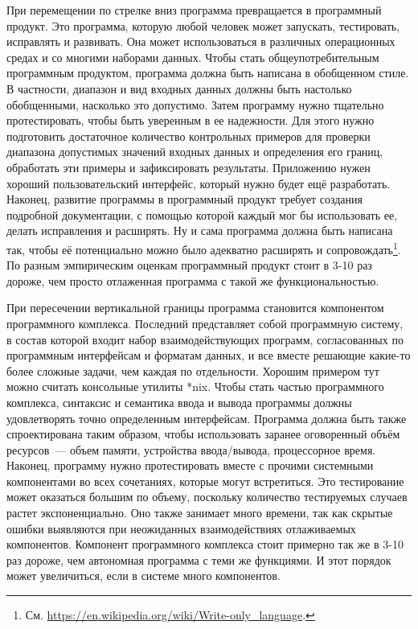 \documentclass{../../text-style}
\begin{document}
При перемещении по стрелке вниз программа превращается в программный продукт. Это программа, которую любой человек может запускать, тестировать, исправлять и развивать. Она может использоваться в различных операционных средах и со многими наборами данных. Чтобы стать общеупотребительным программным продуктом, программа должна быть написана в обобщенном стиле. В частности, диапазон и вид входных данных должны быть настолько обобщенными, насколько это допустимо. Затем программу нужно тщательно протестировать, чтобы быть уверенным в ее надежности. Для этого нужно подготовить достаточное количество контрольных примеров для проверки диапазона допустимых значений входных данных и определения его границ, обработать эти примеры и зафиксировать результаты. Приложению нужен хороший пользовательский интерфейс, который нужно будет ещё разработать. Наконец, развитие программы в программный продукт требует создания подробной документации, с помощью которой каждый мог бы использовать ее, делать исправления и расширять. Ну и сама программа должна быть написана так, чтобы её потенциально можно было адекватно расширять и сопровождать\footnote{См. \url{https://en.wikipedia.org/wiki/Write-only_language}.}. По разным эмпирическим оценкам программный продукт стоит в 3-10 раз дороже, чем просто отлаженная программа с такой же функциональностью. 

При пересечении вертикальной границы программа становится компонентом программного комплекса. Последний представляет собой программную систему, в состав которой входит набор взаимодействующих программ, согласованных по программным интерфейсам и форматам данных, и все вместе решающие какие-то более сложные задачи, чем каждая по отдельности. Хорошим примером тут можно считать консольные утилиты *nix. Чтобы стать частью программного комплекса, синтаксис и семантика ввода и вывода программы должны удовлетворять точно определенным интерфейсам. Программа должна быть также спроектирована таким образом, чтобы использовать заранее оговоренный объём ресурсов~--- объем памяти, устройства ввода/вывода, процессорное время. Наконец, программу нужно протестировать вместе с прочими системными компонентами во всех сочетаниях, которые могут встретиться. Это тестирование может оказаться большим по объему, поскольку количество тестируемых случаев растет экспоненциально. Оно также занимает много времени, так как скрытые ошибки выявляются при неожиданных взаимодействиях отлаживаемых компонентов. Компонент программного комплекса стоит примерно так же в 3-10 раз дороже, чем автономная программа с теми же функциями. И этот порядок может увеличиться, если в системе много компонентов. 
\end{document}
